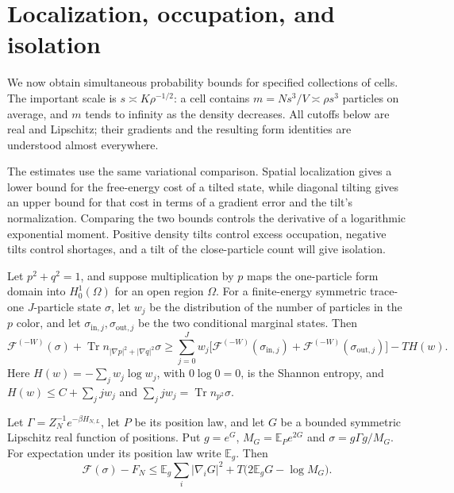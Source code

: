\section{Localization, occupation, and isolation}\label{sec:localization}

We now obtain simultaneous probability bounds for specified collections
of cells. The important scale is $s\asymp K\rho^{-1/2}$: a cell contains
$m=Ns^3/V\asymp\rho s^3$ particles on average, and $m$ tends to infinity
as the density decreases. All cutoffs below are real and Lipschitz;
their gradients and the resulting form identities are understood
almost everywhere.

The estimates use the same variational comparison. Spatial localization
gives a lower bound for the free-energy cost of a tilted state, while
diagonal tilting gives an upper bound for that cost in terms of a gradient
error and the tilt's normalization. Comparing the two bounds controls
the derivative of a logarithmic exponential moment. Positive density
tilts control excess occupation, negative tilts control shortages, and
a tilt of the close-particle count will give isolation.

\begin{lemma}\label{lem:localization-tilt}
Let $p^2+q^2=1$, and suppose multiplication by $p$ maps the one-particle
form domain into $H^1_0(\Omega)$ for an open region $\Omega$.
For a finite-energy symmetric trace-one $J$-particle state $\sigma$, let $w_j$ be
the distribution of the number of particles in the $p$ color, and
let $\sigma_{\mathrm{in},j},\sigma_{\mathrm{out},j}$ be the two
conditional marginal states. Then
\begin{equation}
 \mathcal F^{(-W)}(\sigma)+\operatorname{Tr}
 n_{|\nabla p|^2+|\nabla q|^2}\sigma
 \geq\sum_{j=0}^Jw_j\bigl[
 \mathcal F^{(-W)}(\sigma_{\mathrm{in},j})+
 \mathcal F^{(-W)}(\sigma_{\mathrm{out},j})\bigr]-TH(w).
 \tag{7}\label{eq:7}
\end{equation}
Here $H(w)=-\sum_jw_j\log w_j$, with $0\log0=0$, is the Shannon
entropy, and $H(w)\leq C+\sum_jjw_j$ and
$\sum_jjw_j=\operatorname{Tr}n_{p^2}\sigma$.

Let $\Gamma=Z_N^{-1}e^{-\beta H_{N,L}}$, let $P$ be its position
law, and let $G$ be a bounded symmetric Lipschitz real function of
positions. Put $g=e^G$, $M_G=\mathbb E_Pe^{2G}$ and
$\sigma=g\Gamma g/M_G$. For expectation under its position law
write $\mathbb E_g$. Then
\begin{equation}
 \mathcal F(\sigma)-F_N\leq
 \mathbb E_g\sum_i|\nabla_iG|^2+
 T\bigl(2\mathbb E_gG-\log M_G\bigr).
 \tag{8}\label{eq:8}
\end{equation}
\end{lemma}

